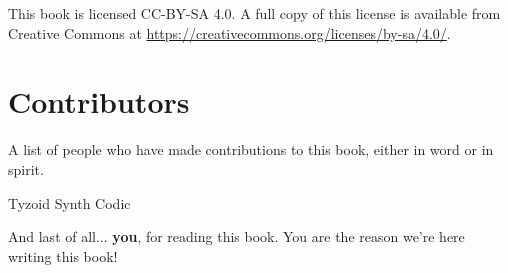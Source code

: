 \documentclass[../main.tex]{subfiles}
\newcommand{\csp}{\hspace{0.15\textwidth}}
\begin{document}
\vfill
This book is licensed CC-BY-SA 4.0. A full copy of this license is available
from Creative Commons at \url{https://creativecommons.org/licenses/by-sa/4.0/}.


\newpage
\section*{Contributors}
A list of people who have made contributions to this book, either in word
or in spirit.

\vspace{2cm}

\begin{center}
Tyzoid \csp
Synth \csp
Codic \csp
\end{center}

\vfill
And last of all... \textbf{you}, for reading this book. You are the reason we're
here writing this book!
\end{document}
